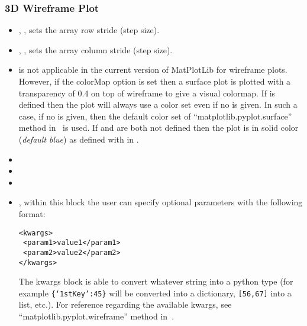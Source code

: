 \subsubsection{3D Wireframe Plot}
\begin{itemize}
  \item {}, , sets the array row
  stride (step size).
  \item {}, , sets the array
  column stride (step size).
  \item {}
  \nb {} is not applicable in the current version of MatPlotLib  for wireframe plots.
  However, if the colorMap option is set then a surface plot is plotted with a transparency of 0.4 on top of wireframe to give a visual colormap.
  \nb If  is defined then the plot will always use a color set even if no  is given.
  In such a case, if no  is given, then the default color set of  ``matplotlib.pyplot.surface'' method in~\cite{MatPlotLib} is used.
  If  and  are both not defined then the plot is in solid color (\textit{default blue}) as defined with  in   .
  \item {}
  \item {}
  \item {}
  \item {}, within this block the user can specify optional
  parameters with the following format:

\begin{lstlisting}[style=XML]
<kwargs>
 <param1>value1</param1>
 <param2>value2</param2>
</kwargs>
\end{lstlisting}

  The kwargs block is able to convert whatever string into a python type (for
  example  \texttt{\{`1stKey':45\}} will
  be converted into a dictionary,
   \texttt{[56,67]}  into a list, etc.).
  For reference regarding the available kwargs, see
  ``matplotlib.pyplot.wireframe'' method in~\cite{MatPlotLib}.
\end{itemize}

